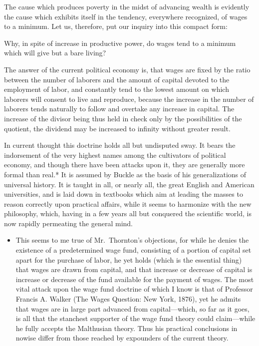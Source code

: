 The cause which produces poverty in the midst of advancing wealth is
evidently the cause which exhibits itself in the tendency, everywhere
recognized, of wages to a minimum. Let us, therefore, put our inquiry
into this compact form:

Why, in spite of increase in productive power, do wages tend to a
minimum which will give but a bare living?

The answer of the current political economy is, that wages are fixed by
the ratio between the number of laborers and the amount of capital
devoted to the employment of labor, and constantly tend to the lowest
amount on which laborers will consent to live and reproduce, because the
increase in the number of laborers tends naturally to follow and
overtake any increase in capital. The increase of the divisor being thus
held in check only by the possibilities of the quotient, the dividend
may be increased to infinity without greater result.

In current thought this doctrine holds all but undisputed sway. It bears
the indorsement of the very highest names among the cultivators of
political economy, and though there have been attacks upon it, they are
generally more formal than real.* It is assumed by Buckle as the basis
of his generalizations of universal history. It is taught in all, or
nearly all, the great English and American universities, and is laid
down in textbooks which aim at leading the masses to reason correctly
upon practical affairs, while it seems to harmonize with the new
philosophy, which, having in a few years all but conquered the
scientific world, is now rapidly permeating the general mind.

\begin{itemize}
\tightlist
\item
  This seems to me true of Mr.~Thornton's objections, for while he
  denies the existence of a predetermined wage fund, consisting of a
  portion of capital set apart for the purchase of labor, he yet holds
  (which is the essential thing) that wages are drawn from capital, and
  that increase or decrease of capital is increase or decrease of the
  fund available for the payment of wages. The most vital attack upon
  the wage fund doctrine of which I know is that of Professor Francis A.
  Walker (The Wages Question: New York, 1876), yet he admits that wages
  are in large part advanced from capital---which, so far as it goes, is
  all that the stanchest supporter of the wage fund theory could
  claim---while he fully accepts the Malthusian theory. Thus his
  practical conclusions in nowise differ from those reached by
  expounders of the current theory.
\end{itemize}

